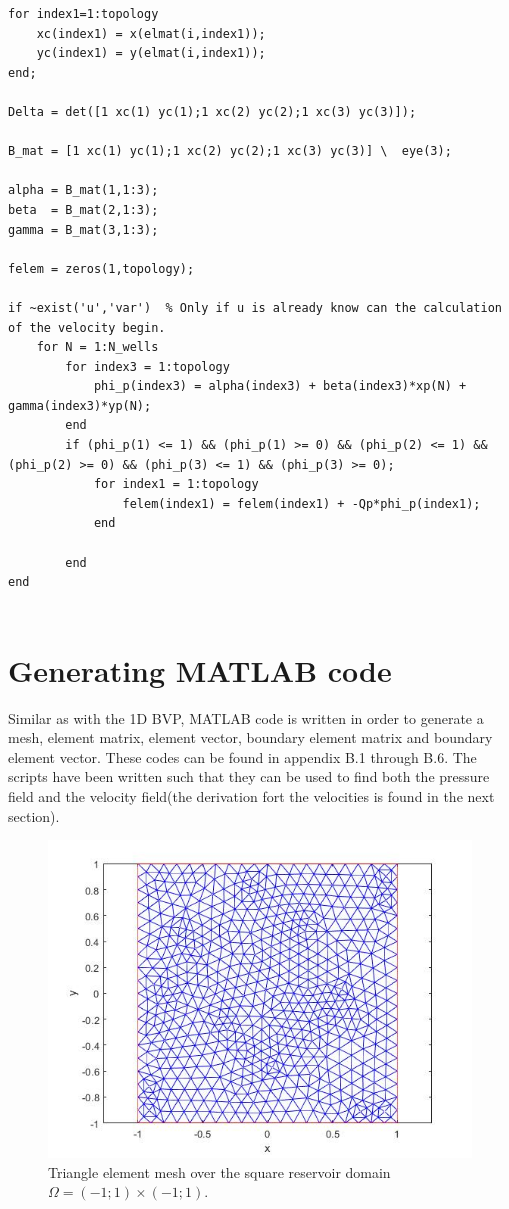 \documentclass[a4paper]{report}
\begin{document}
\begin{lstlisting}
for index1=1:topology
	xc(index1) = x(elmat(i,index1));
	yc(index1) = y(elmat(i,index1));
end;

Delta = det([1 xc(1) yc(1);1 xc(2) yc(2);1 xc(3) yc(3)]);

B_mat = [1 xc(1) yc(1);1 xc(2) yc(2);1 xc(3) yc(3)] \  eye(3);

alpha = B_mat(1,1:3);
beta  = B_mat(2,1:3);
gamma = B_mat(3,1:3);

felem = zeros(1,topology);

if ~exist('u','var')  % Only if u is already know can the calculation of the velocity begin.
	for N = 1:N_wells
		for index3 = 1:topology
			phi_p(index3) = alpha(index3) + beta(index3)*xp(N) + gamma(index3)*yp(N);
		end
		if (phi_p(1) <= 1) && (phi_p(1) >= 0) && (phi_p(2) <= 1) && (phi_p(2) >= 0) && (phi_p(3) <= 1) && (phi_p(3) >= 0);
			for index1 = 1:topology
				felem(index1) = felem(index1) + -Qp*phi_p(index1); 
			end

		end
end


\end{lstlisting}


\section{Generating MATLAB code}

Similar as with the 1D BVP, MATLAB code is written in order to generate a mesh, element matrix, element vector, boundary element matrix and boundary element vector. These codes can be found in appendix B.1 through B.6. The scripts have been written such that they can be used to find both the pressure field and the velocity field(the derivation fort the velocities is found in the next section).


\begin{figure}[h]
	\centering
	\includegraphics[width=150mm]{meshgrid2D.jpg}
	\caption{Triangle element mesh over the square reservoir domain $\Omega=(-1;1)\times (-1;1)$. \label{overflow}}
\end{figure}
\end{document}
